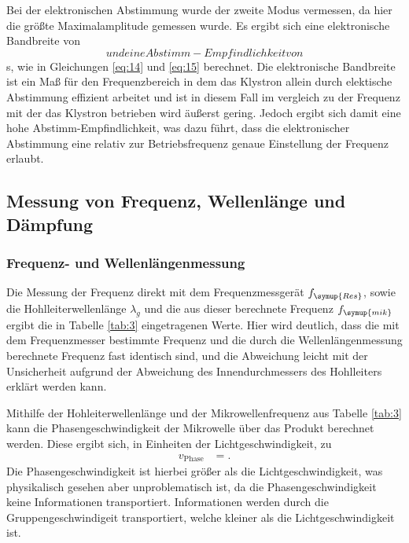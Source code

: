             Bei der elektronischen Abstimmung wurde der zweite Modus vermessen, da hier die größte Maximalamplitude gemessen wurde.
            Es ergibt sich eine elektronische Bandbreite von  $$  und eine Abstimm-Empfindlichkeit von $$s, wie in Gleichungen \eqref{eq:14} und \eqref{eq:15} berechnet.
            Die elektronische Bandbreite ist ein Maß für den Frequenzbereich in dem das Klystron allein durch elektische Abstimmung effizient arbeitet und ist in diesem Fall im vergleich zu der Frequenz mit der das Klystron betrieben wird äußerst gering.
            Jedoch ergibt sich damit eine hohe Abstimm-Empfindlichkeit, was dazu führt, dass die elektronischer Abstimmung eine relativ zur Betriebsfrequenz genaue Einstellung der Frequenz erlaubt.

        \subsection{Messung von Frequenz, Wellenlänge und Dämpfung}
            \subsubsection{Frequenz- und Wellenlängenmessung\label{sssec:6.2.1}}
                Die Messung der Frequenz direkt mit dem Frequenzmessgerät $f_{\symup{Res}}$, sowie die Hohlleiterwellenlänge $\lambda_g$ und die aus dieser berechnete Frequenz $f_{\symup{mik}}$ ergibt die in Tabelle \ref{tab:3} eingetragenen Werte.
                Hier wird deutlich, dass die mit dem Frequenzmesser bestimmte Frequenz und die durch die Wellenlängenmessung berechnete Frequenz fast identisch sind, und die Abweichung leicht mit der Unsicherheit aufgrund der Abweichung des Innendurchmessers des Hohlleiters erklärt werden kann.
                
                Mithilfe der Hohleiterwellenlänge und der Mikrowellenfrequenz aus Tabelle \ref{tab:3} kann die Phasengeschwindigkeit der
                Mikrowelle über das Produkt berechnet werden. Diese ergibt sich, in Einheiten der 
                Lichtgeschwindigkeit, zu 
                \begin{align}
                    v_{\text{Phase}} &= \text{}.
                \end{align}
                Die Phasengeschwindigkeit ist hierbei größer als die Lichtgeschwindigkeit, was physikalisch
                gesehen aber unproblematisch ist, da die Phasengeschwindigkeit keine Informationen transportiert.
                Informationen werden durch die Gruppengeschwindigeit transportiert, welche kleiner als die Lichtgeschwindigkeit ist.
